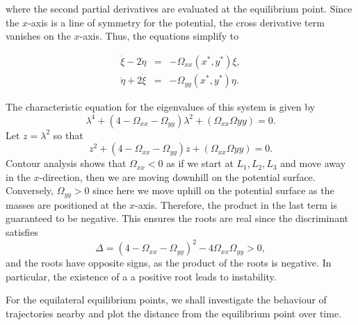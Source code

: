 \documentclass{article}
\begin{document}
where the second partial derivatives are evaluated at the equilibrium point. Since the \(x\)-axis is a line of symmetry for the potential, the cross derivative term vanishes on the \(x\)-axis. Thus, the equations simplify to

\begin{eqnarray*}
    \ddot\xi - 2\dot\eta & = & -\Omega_{xx}(x^*, y^*)\xi, \\
    \ddot\eta + 2\dot\xi & = & -\Omega_{yy}(x^*, y^*)\eta.
\end{eqnarray*}

The characteristic equation for the eigenvalues of this system is given by
\[ \lambda^4 + (4 - \Omega_{xx} - \Omega_{yy})\lambda^2 + (\Omega_{xx}\Omega{yy}) = 0. \]
Let \(z = \lambda^2\) so that
\[ z^2 + (4 - \Omega_{xx} - \Omega_{yy})z + (\Omega_{xx}\Omega{yy}) = 0. \]
Contour analysis shows that \(\Omega_{xx} < 0\) as if we start at \(L_1,L_2,L_3\) and move away in the \(x\)-direction, then we are moving downhill on the potential surface. Conversely, \(\Omega_{yy} > 0\) since here we move uphill on the potential surface as the masses are positioned at the \(x\)-axis. Therefore, the product in the last term is guaranteed to be negative. This ensures the roots are real since the discriminant satisfies
\[ \Delta = (4 - \Omega_{xx} - \Omega_{yy})^2 - 4\Omega_{xx}\Omega_{yy} > 0, \]
and the roots have opposite signs, as the product of the roots is negative. In particular, the existence of a a positive root leads to instability.

For the equilateral equilibrium points, we shall investigate the behaviour of trajectories nearby and plot the distance from the equilibrium point over time.
\end{document}
